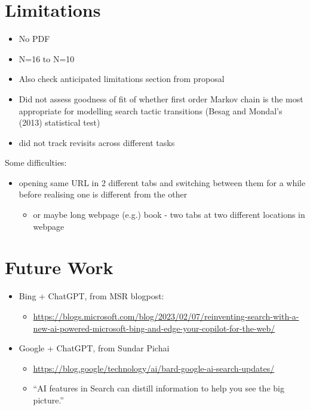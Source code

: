 \documentclass[letterpaper, nobind]{templates/ociamthesis}
\providecommand{\tightlist}{%
  \setlength{\itemsep}{0pt}\setlength{\parskip}{0pt}}
\begin{document}
\hypertarget{limitations}{%
\section{Limitations}\label{limitations}}

\begin{itemize}
\tightlist
\item
  No PDF
\item
  N=16 to N=10
\item
  Also check anticipated limitations section from proposal
\item
  Did not assess goodness of fit of whether first order Markov chain is the most appropriate for modelling search tactic transitions (Besag and Mondal's (2013) statistical test)
\item
  did not track revisits across different tasks
\end{itemize}

Some difficulties:

\begin{itemize}
\tightlist
\item
  opening same URL in 2 different tabs and switching between them for a while before realising one is different from the other

  \begin{itemize}
  \tightlist
  \item
    or maybe long webpage (e.g.) book - two tabs at two different locations in webpage
  \end{itemize}
\end{itemize}

\hypertarget{future-work}{%
\section{Future Work}\label{future-work}}

\begin{itemize}
\tightlist
\item
  Bing + ChatGPT, from MSR blogpost:

  \begin{itemize}
  \tightlist
  \item
    \url{https://blogs.microsoft.com/blog/2023/02/07/reinventing-search-with-a-new-ai-powered-microsoft-bing-and-edge-your-copilot-for-the-web/}
  \end{itemize}
\item
  Google + ChatGPT, from Sundar Pichai

  \begin{itemize}
  \tightlist
  \item
    \url{https://blog.google/technology/ai/bard-google-ai-search-updates/}
  \item
    ``AI features in Search can distill information to help you see the big picture.''
  \end{itemize}
\end{itemize}
\end{document}
